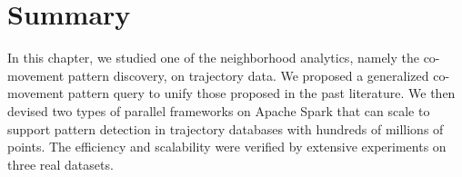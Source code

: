 \section{Summary}
\label{sec:concl}
In this chapter, we studied one of the neighborhood analytics, namely
the co-movement pattern discovery, on trajectory data. 
We proposed a generalized co-movement pattern query to unify those proposed in the past literature. 
We then devised two types of parallel frameworks on Apache Spark 
that can scale to support pattern detection in trajectory databases with hundreds of millions of points. 
The efficiency and scalability were verified by extensive experiments on three real datasets. 

